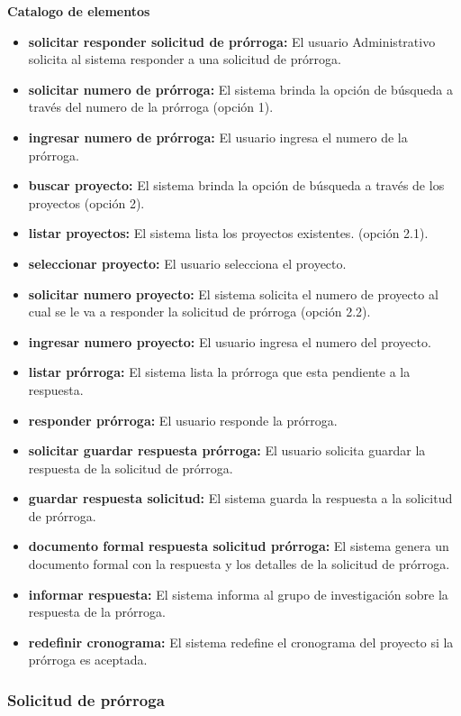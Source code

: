 \documentclass[12pt,oneside,letterpaper]{report}
\begin{document}
\textbf{Catalogo de elementos}
\begin{itemize}
  \item \textbf{solicitar responder solicitud de prórroga:} El usuario Administrativo solicita al sistema responder a una solicitud de prórroga.
  \item \textbf{solicitar numero de prórroga:} El sistema brinda la opción de búsqueda a través del numero de la prórroga (opción 1).
  \item \textbf{ingresar numero de prórroga:} El usuario ingresa el numero de la prórroga.
  \item \textbf{buscar proyecto:} El sistema brinda la opción de búsqueda a través de los proyectos (opción 2).
  \item \textbf{listar proyectos:} El sistema lista los proyectos existentes. (opción 2.1).
  \item \textbf{seleccionar proyecto:} El usuario selecciona el proyecto.
  \item \textbf{solicitar numero proyecto:} El sistema solicita el numero de proyecto al cual se le va a responder la solicitud de prórroga (opción 2.2).
  \item \textbf{ingresar numero  proyecto:} El usuario ingresa el numero del proyecto.
  \item \textbf{listar prórroga:} El sistema lista la prórroga que esta pendiente a la respuesta.
  \item \textbf{responder prórroga:} El usuario responde la prórroga.
  \item \textbf{solicitar guardar respuesta prórroga:} El usuario solicita guardar la respuesta de la solicitud de prórroga.
  \item \textbf{guardar respuesta solicitud:} El sistema guarda la respuesta a la solicitud de prórroga.
  \item \textbf{documento formal respuesta solicitud prórroga:} El sistema genera un documento formal con la respuesta y los detalles de la solicitud de prórroga.
  \item \textbf{informar respuesta:} El sistema informa al grupo de investigación sobre la respuesta de la prórroga.
  \item \textbf{redefinir cronograma:} El sistema redefine el cronograma del proyecto si la prórroga es aceptada.
\end{itemize}


\subsubsection{Solicitud de prórroga}
\end{document}
